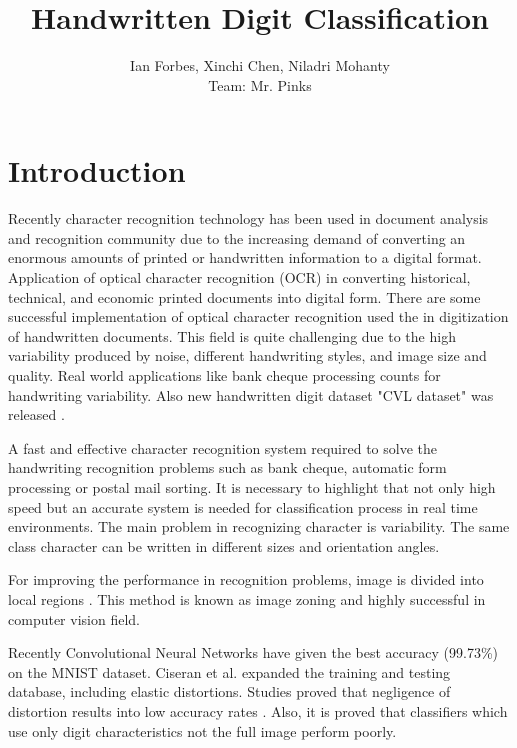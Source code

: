 \documentclass[10pt,twocolumn]{article}
\title{Handwritten Digit Classification}
\author{Ian Forbes, Xinchi Chen, Niladri Mohanty\\ Team: Mr. Pinks}
\begin{document}
\section{Introduction}
Recently character recognition technology has been used in document analysis and recognition community due to the increasing demand of converting an enormous amounts of printed or handwritten information to a digital format. Application of optical character recognition (OCR) in converting historical, technical, and economic printed documents into digital form. There are some successful implementation of optical character recognition used the in digitization of handwritten documents. This field is quite challenging due to the high variability produced by noise, different handwriting styles, and image size and quality. Real world applications like bank cheque processing counts for handwriting variability\cite {diem2013icdar}. Also new handwritten digit dataset "CVL dataset" was released \cite {liu2003handwritten}. 

A fast and effective character recognition system required to solve the handwriting recognition problems such as bank cheque, automatic form processing or postal mail sorting. It is necessary to highlight that not only high speed but an accurate system is needed for classification process in real time environments. The main problem in recognizing character is variability. The same class character can be written in different sizes and orientation angles.

For improving the performance in recognition problems, image is divided into local regions \cite {lazebnik2006beyond}. This method is known as image zoning and highly successful in computer vision field\cite {ciresan2012multi}.

Recently Convolutional Neural Networks have given the best accuracy (99.73\%) on the MNIST dataset. Ciseran et al. expanded the training and testing database, including elastic distortions. Studies proved that negligence of distortion results into low accuracy rates \cite {gil2014handwritten}. Also, it is proved that classifiers which use only digit characteristics not the full image perform poorly.
\end{document}
